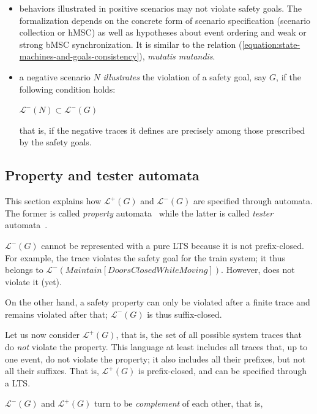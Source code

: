 \begin{itemize}
\item behaviors illustrated in positive scenarios may not violate safety goals. The formalization depends on the concrete form of scenario specification (scenario collection or hMSC) as well as hypotheses about event ordering and weak or strong bMSC synchronization. It is similar to the relation (\ref{equation:state-machines-and-goals-consistency}), \emph{mutatis mutandis}.
\item a negative scenario $N$ \emph{illustrates} the violation of a safety goal, say $G$, if the following condition holds:
\begin{center}
$\mathcal{L}^{-}(N) \subset \mathcal{L}^{-}(G)$
\end{center}
\noindent that is, if the negative traces it defines are precisely among those prescribed by the safety goals.
\end{itemize}

\subsection{Property and tester automata}

This section explains how $\mathcal{L}^{+}(G)$ and  $\mathcal{L}^{-}(G)$ are specified through automata. The former is called \emph{property} automata~\cite{Letier:2005, Letier:2008} while the latter is called \emph{tester} automata~\cite{Giannakopoulou:2003}.

$\mathcal{L}^{-}(G)$ cannot be represented with a pure LTS because it is not prefix-closed. For example, the trace  violates the safety goal for the train system; it thus belongs to $\mathcal{L}^{-}(Maintain[DoorsClosed While Moving])$. However,  does not violate it (yet). 

On the other hand, a safety property can only be violated after a finite trace and remains violated after that; $\mathcal{L}^{-}(G)$ is thus suffix-closed. 

Let us now consider $\mathcal{L}^{+}(G)$, that is, the set of all possible system traces that do \emph{not} violate the property. This language at least includes all traces that, up to one event, do not violate the property; it also includes all their prefixes, but not all their suffixes. That is, $\mathcal{L}^{+}(G)$ is prefix-closed, and can be specified through a LTS. 

$\mathcal{L}^{-}(G)$ and $\mathcal{L}^{+}(G)$ turn to be \emph{complement} of each other, that is, 

